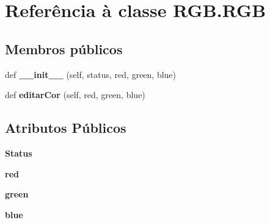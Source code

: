 \hypertarget{class_r_g_b_1_1_r_g_b}{}\section{Referência à classe R\+G\+B.\+R\+GB}
\label{class_r_g_b_1_1_r_g_b}
\subsection*{Membros públicos}
\begin{DoxyCompactItemize}
\item 
def {\bfseries \+\_\+\+\_\+init\+\_\+\+\_\+} (self, status, red, green, blue)\hypertarget{class_r_g_b_1_1_r_g_b_a0383a5e4fe0b442f6a70822673733290}{}\label{class_r_g_b_1_1_r_g_b_a0383a5e4fe0b442f6a70822673733290}

\item 
def {\bfseries editar\+Cor} (self, red, green, blue)\hypertarget{class_r_g_b_1_1_r_g_b_a3bb927a8735d1db3e14f62fecd4a15a8}{}\label{class_r_g_b_1_1_r_g_b_a3bb927a8735d1db3e14f62fecd4a15a8}

\end{DoxyCompactItemize}
\subsection*{Atributos Públicos}
\begin{DoxyCompactItemize}
\item 
{\bfseries Status}\hypertarget{class_r_g_b_1_1_r_g_b_a329b9b7176a9e92e2099fa04bb1ecc2e}{}\label{class_r_g_b_1_1_r_g_b_a329b9b7176a9e92e2099fa04bb1ecc2e}

\item 
{\bfseries red}\hypertarget{class_r_g_b_1_1_r_g_b_a81b29a29f06cc88ce5f9baf9678b1632}{}\label{class_r_g_b_1_1_r_g_b_a81b29a29f06cc88ce5f9baf9678b1632}

\item 
{\bfseries green}\hypertarget{class_r_g_b_1_1_r_g_b_a6ba32f5d4bbbe9bd822b96eef9eb2fa6}{}\label{class_r_g_b_1_1_r_g_b_a6ba32f5d4bbbe9bd822b96eef9eb2fa6}

\item 
{\bfseries blue}\hypertarget{class_r_g_b_1_1_r_g_b_a0467e1c0b143c0abb65c6bba2efe9267}{}\label{class_r_g_b_1_1_r_g_b_a0467e1c0b143c0abb65c6bba2efe9267}

\end{DoxyCompactItemize}
